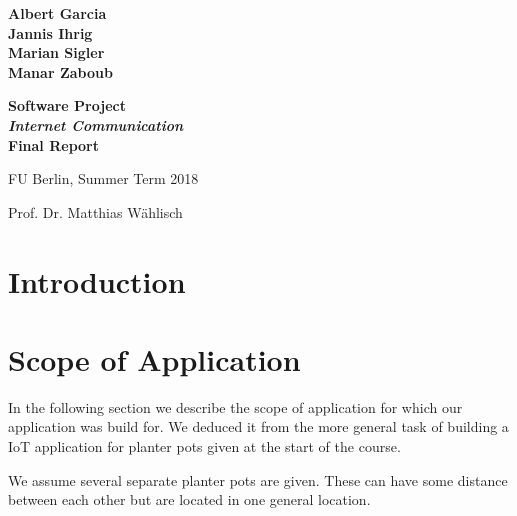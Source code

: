 \documentclass[11pt,paper=a4,parskip=half]{scrartcl}
\begin{document}
\thispagestyle{empty}


\begin{center}

\begin{spacing}{1.2}
\textbf{ \LARGE
Albert Garcia \\
Jannis Ihrig \\
Marian Sigler \\
Manar Zaboub \\
}

\end{spacing}\vspace{2.5em}


\textbf{ \Huge Software Project \\ \emph{Internet Communication} \\\vspace{0.8em}
Final Report}
\vspace{2.5em}

\begin{spacing}{1}
\Large

FU Berlin, Summer Term 2018

Prof. Dr. Matthias Wählisch
\end{spacing}
\end{center}

\vspace{10mm}


\setcounter{tocdepth}{2}
\tableofcontents

\newpage



\section{Introduction}






\section{Scope of Application}
\label{sec:usecase}

  In the following section we describe the scope of application for which our
  application was build for. We deduced it from the more general task of
  building a IoT application for planter pots given at the start of the course.

  We assume several separate planter pots are given. These can have some
  distance between each other but are located in one general location.
\end{document}
